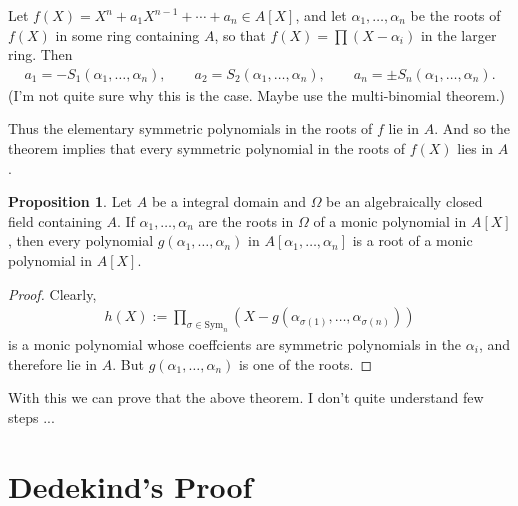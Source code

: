 \documentclass[a4paper]{book}
\theoremstyle{definition}
\newtheorem{proposition}[definition]{Proposition}
\begin{document}
Let \(f(X) = X^n + a_1 X^{n-1} + \cdots + a_n \in A[X]\), and let \(\alpha_1, \ldots, \alpha_n\) be the roots of \(f(X)\) in some ring containing \(A\), so that \(f(X) = \prod (X - \alpha_i)\) in the larger ring. Then
\begin{align*}
    a_1 = -S_1(\alpha_1, \ldots, \alpha_n), \qquad a_2 = S_2(\alpha_1, \ldots, \alpha_n), \qquad a_n = \pm S_n(\alpha_1, \ldots, \alpha_n) \text{.}
\end{align*}
(I'm not quite sure why this is the case. Maybe use the multi-binomial theorem.)

Thus the elementary symmetric polynomials in the roots of \(f\) lie in \(A\). And so the theorem implies that every symmetric polynomial in the roots of \(f(X)\) lies in \(A\).
\begin{thmbox}
    \begin{proposition}
        Let \(A\) be a integral domain and \(\Omega\) be an algebraically closed field containing \(A\). If \(\alpha_1, \ldots, \alpha_n\) are the roots in \(\Omega\) of a monic polynomial in \(A[X]\), then every polynomial \(g(\alpha_1, \ldots, \alpha_n)\) in \(A[\alpha_1, \ldots, \alpha_n]\) is a root of a monic polynomial in \(A[X]\).
    \end{proposition}
\end{thmbox}
\begin{proof}
    Clearly,
    \begin{align*}
        h(X) := \prod_{\sigma \in \mathrm{Sym}_n} (X -  g(\alpha_{\sigma(1)}, \ldots, \alpha_{\sigma(n  )}))
    \end{align*}
    is a monic polynomial whose coeffcients are symmetric polynomials in the \(\alpha_i\), and therefore lie in \(A\). But \(g(\alpha_1, \ldots, \alpha_n)\) is one of the roots.
\end{proof}
With this we can prove that the above theorem. I don't quite understand few steps ...

\section*{Dedekind's Proof}
\end{document}
